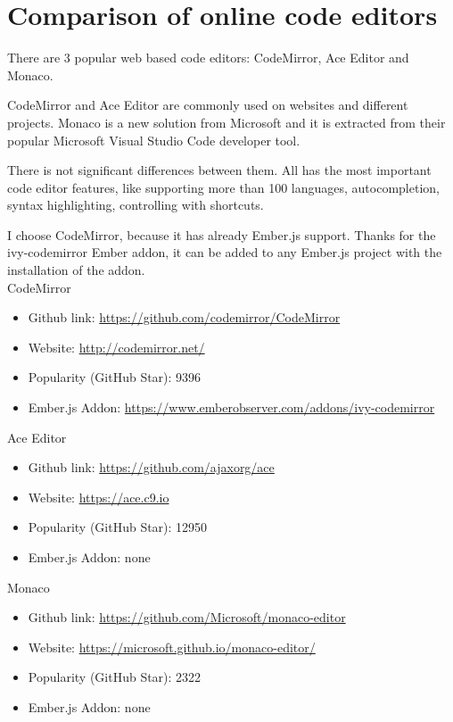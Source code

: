 \documentclass[12pt, a4paper, oneside, openright, medskipamount]{report}
\begin{document}
\section{Comparison of online code editors}

There are 3 popular web based code editors: CodeMirror, Ace Editor and Monaco.

CodeMirror and Ace Editor are commonly used on websites and different projects. Monaco is a new solution from Microsoft and it is extracted from their popular Microsoft Visual Studio Code developer tool.

There is not significant differences between them. All has the most important code editor features, like supporting more than 100 languages, autocompletion, syntax highlighting, controlling with shortcuts.

I choose CodeMirror, because it has already Ember.js support. Thanks for the ivy-codemirror Ember addon, it can be added to any Ember.js project with the installation of the addon. \\

\noindent CodeMirror
\begin{itemize}[noitemsep]
\item Github link: \url{https://github.com/codemirror/CodeMirror}
\item Website: \url{http://codemirror.net/}
\item Popularity (GitHub Star): 9396
\item Ember.js Addon: \url{https://www.emberobserver.com/addons/ivy-codemirror} \\
\end{itemize}

\noindent Ace Editor
\begin{itemize}[noitemsep]
\item Github link: \url{https://github.com/ajaxorg/ace}
\item Website: \url{https://ace.c9.io}
\item Popularity (GitHub Star): 12950
\item Ember.js Addon: none
\end{itemize}

\noindent Monaco
\begin{itemize}[noitemsep]
\item Github link: \url{https://github.com/Microsoft/monaco-editor}
\item Website: \url{https://microsoft.github.io/monaco-editor/}
\item Popularity (GitHub Star): 2322
\item Ember.js Addon: none
\end{itemize}
\end{document}
